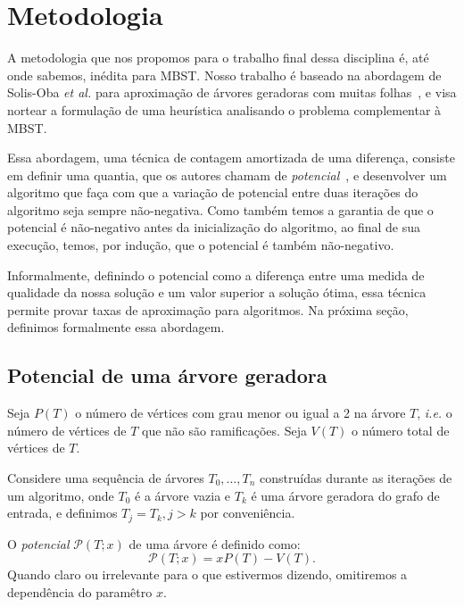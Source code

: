 \documentclass[conference]{IEEEtran}
\begin{document}
\section{Metodologia} \label{sec:methodology}

A metodologia que nos propomos para o trabalho final dessa disciplina é, até onde sabemos, inédita para MBST.
Nosso trabalho \'e baseado na abordagem de Solis-Oba \textit{et al.} para aproximação de árvores
geradoras com muitas folhas~\cite{solis-oba2017}, e visa nortear a formulação de uma heurística
analisando o problema complementar à MBST.

Essa abordagem, uma t\'ecnica de contagem amortizada de uma diferen\c{c}a, consiste em definir uma
quantia, que os autores chamam de \emph{potencial}~\cite{solis-oba2017}, e desenvolver um algoritmo
que fa\c{c}a com que a varia\c{c}\~ao de potencial entre duas itera\c{c}\~oes do algoritmo seja
sempre n\~ao-negativa. Como tamb\'em temos a garantia de que o potencial \'e n\~ao-negativo antes
da inicializa\c{c}\~ao do algoritmo, ao final de sua execu\c{c}\~ao, temos, por indu\c{c}\~ao, que
o potencial \'e tamb\'em n\~ao-negativo.

Informalmente, definindo o potencial como a diferen\c{c}a entre uma medida de qualidade da nossa
solu\c{c}\~ao e um valor superior a solu\c{c}\~ao \'otima, essa t\'ecnica permite provar taxas de
aproxima\c{c}\~ao para algoritmos. Na pr\'oxima se\c{c}\~ao, definimos formalmente essa abordagem.

\subsection{Potencial de uma \'arvore geradora} \label{sec:potential}
Seja $P(T)$ o n\'umero de v\'ertices com grau menor ou igual a 2 na \'arvore $T$, \textit{i.e.} o
n\'umero de v\'ertices de $T$ que n\~ao s\~ao ramifica\c{c}\~oes. Seja $V(T)$ o n\'umero total de
v\'ertices de $T$.

Considere uma sequ\^encia de \'arvores $T_0, \dots, T_n$ constru\'idas durante as itera\c{c}\~oes
de um algoritmo, onde $T_0$ \'e a \'arvore vazia e $T_k$ \'e uma \'arvore geradora do grafo de
entrada, e definimos $T_j = T_k, j > k$ por conveni\^encia.

O \emph{potencial} $\mathcal{P}(T; x)$ de uma \'arvore \'e definido como:
\begin{equation}
  \mathcal{P}(T; x) = xP(T) - V(T).
\end{equation}
Quando claro ou irrelevante para o que estivermos dizendo, omitiremos a depend\^encia do param\^etro
$x$.
\end{document}
